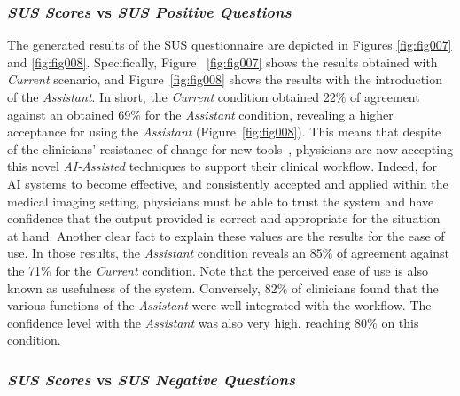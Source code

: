 \hfill

\subsubsection{{\it SUS Scores} vs {\it SUS Positive Questions}}

The generated results of the SUS questionnaire are depicted in Figures \ref{fig:fig007} and \ref{fig:fig008}.
Specifically, Figure ~\ref{fig:fig007} shows the results obtained with
{\it Current} scenario, and Figure~\ref{fig:fig008} shows the results with the introduction of the {\it Assistant}.
In short, the {\it Current} condition obtained 22\% of agreement against an obtained 69\% for the {\it Assistant} condition, revealing a higher acceptance for using the {\it Assistant} (Figure~\ref{fig:fig008}).
This means that despite of the clinicians' resistance of change for new tools~\cite{Calisto:2017:TTM:3132272.3134111, gagnon2014electronic}, physicians are now accepting this novel {\it AI-Assisted} techniques to support their clinical workflow.
Indeed, for AI systems to become effective, and consistently accepted and applied within the medical imaging setting, physicians must be able to trust the system and have confidence that the output provided is correct and appropriate for the situation at hand.
Another clear fact to explain these values are the results for the ease of use.
In those results, the {\it Assistant} condition reveals an 85\% of agreement against the 71\% for the {\it Current} condition.
Note that the perceived ease of use is also known as usefulness of the system.
Conversely, 82\% of clinicians found that the various functions of the {\it Assistant} were well integrated with the workflow.
The confidence level with the {\it Assistant} was also very high, reaching 80\% on this condition.

\subsubsection{{\it SUS Scores} vs {\it SUS Negative Questions}}

